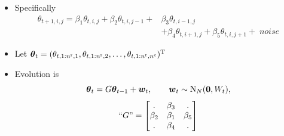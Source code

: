 \begin{frame}
\begin{itemize}
\item Specifically
\begin{align*}
\theta_{t+1,i,j} = \beta_1 \theta_{t,i,j} + \beta_2 \theta_{t,i,j-1} + &\beta_3 \theta_{t,i-1,j} \\
& + \beta_4 \theta_{t,i+1,j} + \beta_5  \theta_{t,i,j+1} + \; \textit{noise}
\end{align*}
\item Let $\boldsymbol{\theta}_t =  ( \theta_{t,1:n^\text{r},1}, \theta_{t,1:n^\text{r},2},\dots,\theta_{t,1:n^\text{r},n^\text{c}})^\text{T}$
\bigskip
\item Evolution is
\begin{equation*}
\boldsymbol{\theta}_t = G \boldsymbol{\theta}_{t-1} + \boldsymbol{w}_t, \qquad \boldsymbol{w}_t \sim \text{N}_N(\boldsymbol{0}, W_t),
\end{equation*}
\begin{equation*}
``G" =  \begin{bmatrix}
. & \beta_3 & .\\
\beta_2 & \beta_1 & \beta_5\\
. & \beta_4 & .\\
\end{bmatrix}
\end{equation*}
\end{itemize}
\end{frame}

